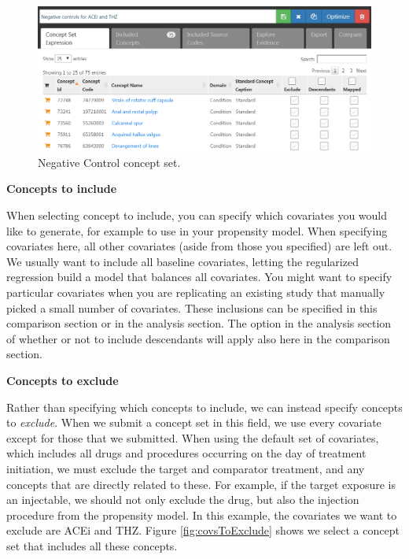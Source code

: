\documentclass[11pt]{book}
\begin{document}
\begin{figure}

{\centering \includegraphics[width=1\linewidth]{images/PopulationLevelEstimation/ncConceptSet} 

}

\caption{Negative Control concept set.}\label{fig:ncConceptSet}
\end{figure}

\textbf{Concepts to include}

When selecting concept to include, you can specify which covariates you
would like to generate, for example to use in your propensity model.
When specifying covariates here, all other covariates (aside from those
you specified) are left out. We usually want to include all baseline
covariates, letting the regularized regression build a model that
balances all covariates. You might want to specify particular covariates
when you are replicating an existing study that manually picked a small
number of covariates. These inclusions can be specified in this
comparison section or in the analysis section. The option in the
analysis section of whether or not to include descendants will apply
also here in the comparison section.

\textbf{Concepts to exclude}

Rather than specifying which concepts to include, we can instead specify
concepts to \emph{exclude}. When we submit a concept set in this field,
we use every covariate except for those that we submitted. When using
the default set of covariates, which includes all drugs and procedures
occurring on the day of treatment initiation, we must exclude the target
and comparator treatment, and any concepts that are directly related to
these. For example, if the target exposure is an injectable, we should
not only exclude the drug, but also the injection procedure from the
propensity model. In this example, the covariates we want to exclude are
ACEi and THZ. Figure \ref{fig:covsToExclude} shows we select a concept
set that includes all these concepts.
\end{document}
